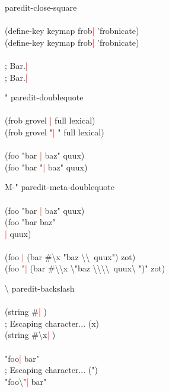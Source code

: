 \documentclass[8pt,a4paper,landscape]{extarticle}
\newcommand{\csr}{\textcolor{red}{| }}
\begin{document}
\begin{multicols}{4}
\begin{eqlist}
\item[\rbrack] paredit-close-square\\
  \\
  (define-key keymap \lbrack frob\csr   \rbrack  'frobnicate)\\
  (define-key keymap \lbrack frob\rbrack \csr  'frobnicate)\\
  \\
  ; \lbrack Bar.\csr \\
  ; \lbrack Bar.\rbrack \csr \\


\item["] paredit-doublequote\\
  \\
  (frob grovel \csr full lexical)\\
  (frob grovel "\csr " full lexical)\\
  \\
  (foo "bar \csr baz" quux)\\
  (foo "bar "\csr baz" quux)\\


\item[M-"] paredit-meta-doublequote\\
  \\
  (foo "bar \csr baz" quux)\\
  (foo "bar baz"\\
  \csr quux)\\
  \\
  (foo \csr (bar \#\textbackslash x "baz \textbackslash\textbackslash~quux")
  zot)\\
  (foo "\csr (bar \#\textbackslash\textbackslash x \textbackslash "baz
  \textbackslash\textbackslash\textbackslash\textbackslash~quux\textbackslash
  ")" zot)\\


\item[\textbackslash] paredit-backslash\\
  \\
  (string \#\csr )\\
  ; Escaping character... (x)\\
  (string \#\textbackslash x\csr )\\
  \\
  "foo\csr bar"\\
  ; Escaping character... (")\\
  "foo\textbackslash "\csr bar"\\


\end{eqlist}
\end{multicols}
\end{document}
